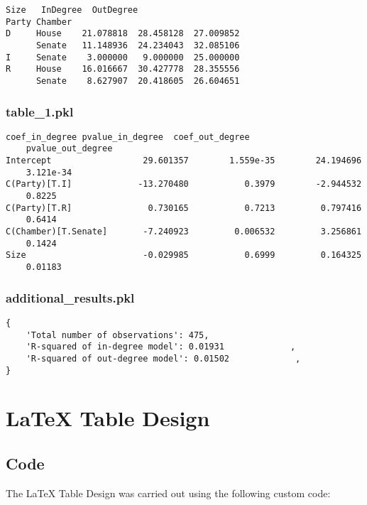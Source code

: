 \documentclass[11pt]{article}
\begin{document}
\begin{Verbatim}[tabsize=4]
                    Size   InDegree  OutDegree
Party Chamber
D     House    21.078818  28.458128  27.009852
      Senate   11.148936  24.234043  32.085106
I     Senate    3.000000   9.000000  25.000000
R     House    16.016667  30.427778  28.355556
      Senate    8.627907  20.418605  26.604651
\end{Verbatim}

\subsubsection*{table\_1.pkl}

\begin{Verbatim}[tabsize=4]
                      coef_in_degree pvalue_in_degree  coef_out_degree
	pvalue_out_degree
Intercept                  29.601357        1.559e-35        24.194696
	3.121e-34
C(Party)[T.I]             -13.270480           0.3979        -2.944532
	0.8225
C(Party)[T.R]               0.730165           0.7213         0.797416
	0.6414
C(Chamber)[T.Senate]       -7.240923         0.006532         3.256861
	0.1424
Size                       -0.029985           0.6999         0.164325
	0.01183
\end{Verbatim}

\subsubsection*{additional\_results.pkl}

\begin{Verbatim}[tabsize=4]
{
    'Total number of observations': 475,
    'R-squared of in-degree model': 0.01931             ,
    'R-squared of out-degree model': 0.01502             ,
}
\end{Verbatim}

\section{LaTeX Table Design}
\subsection{{Code}}
The LaTeX Table Design was carried out using the following custom code:
\end{document}
